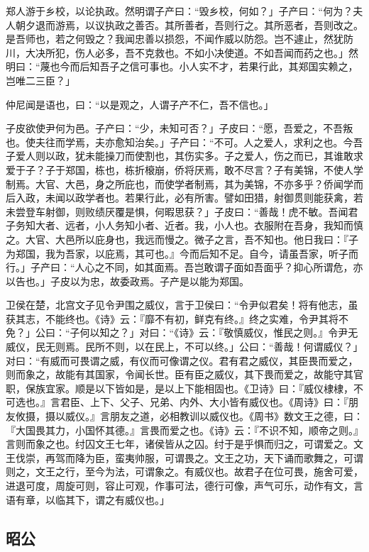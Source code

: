 \documentclass[]{article}
\begin{document}
郑人游于乡校，以论执政。然明谓子产曰：``毁乡校，何如？」子产曰：``何为？夫人朝夕退而游焉，以议执政之善否。其所善者，吾则行之。其所恶者，吾则改之。是吾师也，若之何毁之？我闻忠善以损怨，不闻作威以防怨。岂不遽止，然犹防川，大决所犯，伤人必多，吾不克救也。不如小决使道。不如吾闻而药之也。」然明曰：``蔑也今而后知吾子之信可事也。小人实不才，若果行此，其郑国实赖之，岂唯二三臣？」

仲尼闻是语也，曰：``以是观之，人谓子产不仁，吾不信也。」

子皮欲使尹何为邑。子产曰：``少，未知可否？」子皮曰：``愿，吾爱之，不吾叛也。使夫往而学焉，夫亦愈知治矣。」子产曰：``不可。人之爱人，求利之也。今吾子爱人则以政，犹未能操刀而使割也，其伤实多。子之爱人，伤之而已，其谁敢求爱于子？子于郑国，栋也，栋折榱崩，侨将厌焉，敢不尽言？子有美锦，不使人学制焉。大官、大邑，身之所庇也，而使学者制焉，其为美锦，不亦多乎？侨闻学而后入政，未闻以政学者也。若果行此，必有所害。譬如田猎，射御贯则能获禽，若未尝登车射御，则败绩厌覆是惧，何暇思获？」子皮曰：``善哉！虎不敏。吾闻君子务知大者、远者，小人务知小者、近者。我，小人也。衣服附在吾身，我知而慎之。大官、大邑所以庇身也，我远而慢之。微子之言，吾不知也。他日我曰：『子为郑国，我为吾家，以庇焉，其可也。』今而后知不足。自今，请虽吾家，听子而行。」子产曰：``人心之不同，如其面焉。吾岂敢谓子面如吾面乎？抑心所谓危，亦以告也。」子皮以为忠，故委政焉。子产是以能为郑国。

卫侯在楚，北宫文子见令尹围之威仪，言于卫侯曰：``令尹似君矣！将有他志，虽获其志，不能终也。《诗》云：『靡不有初，鲜克有终。』终之实难，令尹其将不免？」公曰：``子何以知之？」对曰：``《诗》云：『敬慎威仪，惟民之则。』令尹无威仪，民无则焉。民所不则，以在民上，不可以终。」公曰：``善哉！何谓威仪？」对曰：``有威而可畏谓之威，有仪而可像谓之仪。君有君之威仪，其臣畏而爱之，则而象之，故能有其国家，令闻长世。臣有臣之威仪，其下畏而爱之，故能守其官职，保族宜家。顺是以下皆如是，是以上下能相固也。《卫诗》曰：『威仪棣棣，不可选也。』言君臣、上下、父子、兄弟、内外、大小皆有威仪也。《周诗》曰：『朋友攸摄，摄以威仪。』言朋友之道，必相教训以威仪也。《周书》数文王之德，曰：『大国畏其力，小国怀其德。』言畏而爱之也。《诗》云：『不识不知，顺帝之则。』言则而象之也。纣囚文王七年，诸侯皆从之囚。纣于是乎惧而归之，可谓爱之。文王伐崇，再驾而降为臣，蛮夷帅服，可谓畏之。文王之功，天下诵而歌舞之，可谓则之，文王之行，至今为法，可谓象之。有威仪也。故君子在位可畏，施舍可爱，进退可度，周旋可则，容止可观，作事可法，德行可像，声气可乐，动作有文，言语有章，以临其下，谓之有威仪也。」

\hypertarget{header-n2352}{%
\subsection{昭公}\label{header-n2352}}
\end{document}
